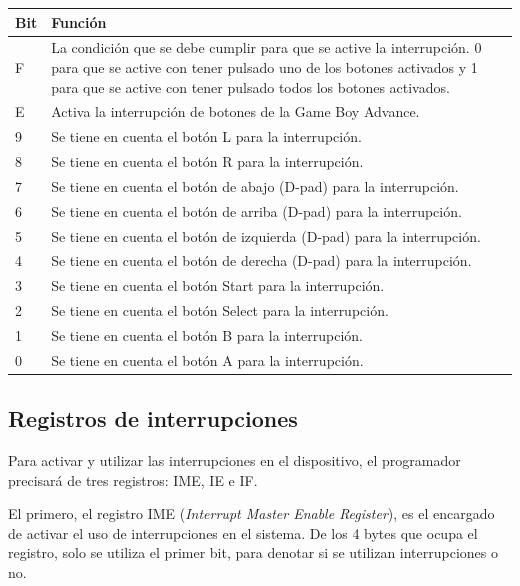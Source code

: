 	\begin{longtable}[h]
		\centering
		\begin{tabular}{| l | p{5cm} |}
			\hline
			\textbf{Bit} & \textbf{Función} \\ \hline
			F &  La condición que se debe cumplir para que se active la interrupción. 0 para que se active con tener pulsado uno de los botones activados y 1 para que se active con tener pulsado todos los botones activados. \\ \hline
			E &  Activa la interrupción de botones de la Game Boy Advance. \\ \hline
			9 &  Se tiene en cuenta el botón L para la interrupción. \\ \hline
			8 &  Se tiene en cuenta el botón R para la interrupción. \\ \hline
			7 &  Se tiene en cuenta el botón de abajo (D-pad) para la interrupción. \\ \hline
			6 &  Se tiene en cuenta el botón de arriba (D-pad) para la interrupción. \\ \hline
			5 &  Se tiene en cuenta el botón de izquierda (D-pad) para la interrupción. \\ \hline
			4 &  Se tiene en cuenta el botón de derecha (D-pad) para la interrupción. \\ \hline
			3 &  Se tiene en cuenta el botón Start para la interrupción. \\ \hline
			2 &  Se tiene en cuenta el botón Select para la interrupción. \\ \hline
			1 &  Se tiene en cuenta el botón B para la interrupción. \\ \hline
			0 &  Se tiene en cuenta el botón A para la interrupción. \\ \hline
		\end{tabular}
		\caption{Los botones en el registro KEYCNT.}\label{tab:keypad_irq_reg}
	\end{longtable}
	\FloatBarrier{}

\subsection{Registros de interrupciones}
Para activar y utilizar las interrupciones en el dispositivo, el programador precisará de tres registros: IME, IE e IF.

El primero, el registro IME (\textit{Interrupt Master Enable Register}), es el encargado de activar el uso de interrupciones en el sistema. De los 4 bytes que ocupa el registro, solo se utiliza el primer bit, para denotar si se utilizan interrupciones o no.

